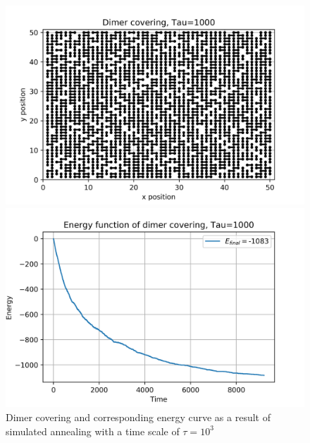 \documentclass{article}
\begin{document}
\begin{figure}[H]
	\begin{minipage}{0.49\linewidth}
		\includegraphics[width=\linewidth]{../images/q4_dimers_t=1e3.png}
	\end{minipage}
	\begin{minipage}{0.49\linewidth}
		\includegraphics[width=\linewidth]{../images/q4_energy_t=1e3.png}
	\end{minipage}
	\caption{Dimer covering and corresponding energy curve as a result of simulated annealing with a time scale of $\tau = 10^3$}
	\label{fig:q4_dimers_t=1e3}
\end{figure}
\end{document}
